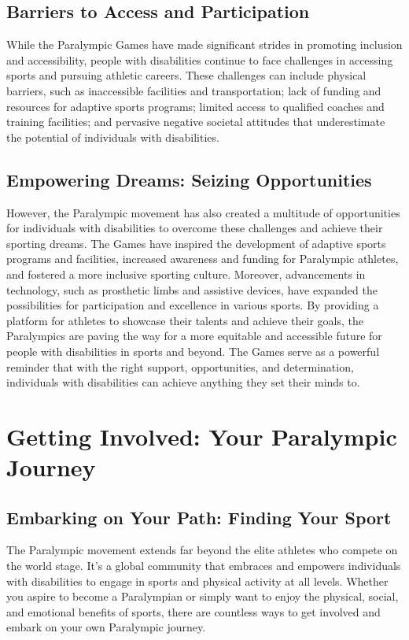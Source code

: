 \subsection{Barriers to Access and Participation}

While the Paralympic Games have made significant strides in promoting inclusion and accessibility, people with disabilities continue to face challenges in accessing sports and pursuing athletic careers. These challenges can include physical barriers, such as inaccessible facilities and transportation; lack of funding and resources for adaptive sports programs; limited access to qualified coaches and training facilities; and pervasive negative societal attitudes that underestimate the potential of individuals with disabilities.

\subsection{Empowering Dreams: Seizing Opportunities}

However, the Paralympic movement has also created a multitude of opportunities for individuals with disabilities to overcome these challenges and achieve their sporting dreams. The Games have inspired the development of adaptive sports programs and facilities, increased awareness and funding for Paralympic athletes, and fostered a more inclusive sporting culture. Moreover, advancements in technology, such as prosthetic limbs and assistive devices, have expanded the possibilities for participation and excellence in various sports. By providing a platform for athletes to showcase their talents and achieve their goals, the Paralympics are paving the way for a more equitable and accessible future for people with disabilities in sports and beyond. The Games serve as a powerful reminder that with the right support, opportunities, and determination, individuals with disabilities can achieve anything they set their minds to.

\section{Getting Involved: Your Paralympic Journey}

\subsection{Embarking on Your Path: Finding Your Sport}

The Paralympic movement extends far beyond the elite athletes who compete on the world stage.  It's a global community that embraces and empowers individuals with disabilities to engage in sports and physical activity at all levels. Whether you aspire to become a Paralympian or simply want to enjoy the physical, social, and emotional benefits of sports, there are countless ways to get involved and embark on your own Paralympic journey.

